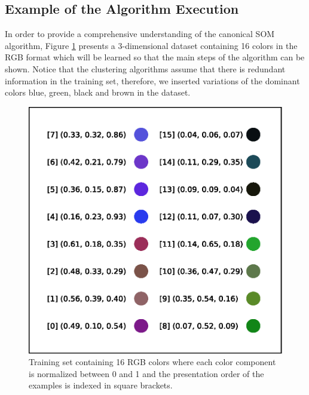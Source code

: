 
\subsection{Example of the Algorithm Execution}
\label{sec:algorithmExecution}

In order to provide a comprehensive understanding of the canonical SOM algorithm, Figure \ref{fig:trset} presents a 3-dimensional dataset containing 16 colors in the RGB format which will be learned so that the main steps of the algorithm can be shown. Notice that the clustering algorithms assume that there is redundant information in the training set, therefore, we inserted variations of the dominant colors blue, green, black and brown in the dataset. 

\begin{figure}[h!]
\centering
\includegraphics[scale=0.6]{figs/trainingSet.eps}
\caption{Training set containing 16 RGB colors where each color component is normalized between 0 and 1 and the presentation order of the examples is indexed in square brackets.}
\label{fig:trset}
\end{figure}

